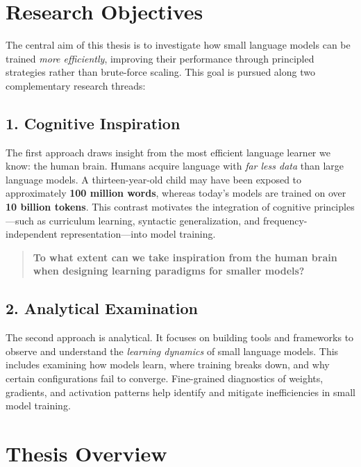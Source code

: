 
\section*{Research Objectives}

The central aim of this thesis is to investigate how small language models can be trained \emph{more efficiently}, improving their performance through principled strategies rather than brute-force scaling. This goal is pursued along two complementary research threads:


\subsection*{1. Cognitive Inspiration}

The first approach draws insight from the most efficient language learner we know: the human brain. Humans acquire language with \emph{far less data} than large language models. A thirteen-year-old child may have been exposed to approximately \textbf{100 million words}, whereas today's models are trained on over \textbf{10 billion tokens}. This contrast motivates the integration of cognitive principles—such as curriculum learning, syntactic generalization, and frequency-independent representation—into model training.

\begin{quote}
\textbf{To what extent can we take inspiration from the human brain when designing learning paradigms for smaller models?} 
\end{quote}

\subsection*{2. Analytical Examination}

The second approach is analytical. It focuses on building tools and frameworks to observe and understand the \emph{learning dynamics} of small language models. This includes examining how models learn, where training breaks down, and why certain configurations fail to converge. Fine-grained diagnostics of weights, gradients, and activation patterns help identify and mitigate inefficiencies in small model training.

\section*{Thesis Overview}

